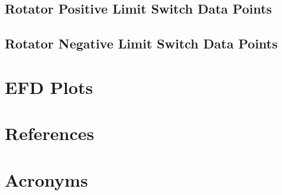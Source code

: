\documentclass[SE,lsstdraft,authoryear,toc]{lsstdoc}
\begin{document}
\subsection{Rotator Positive Limit Switch Data Points}
\subsection{Rotator Negative Limit Switch Data Points}

\section{EFD Plots}


\section{References} \label{sec:bib}
\renewcommand{\refname}{} %


\section{Acronyms} \label{sec:acronyms}

\end{document}
